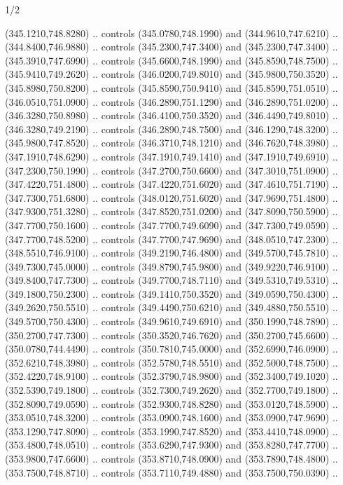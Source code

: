 \begin{flagdescription}{1/2}
\begin{scope}[xshift=0.5\flaglength]
\begin{scope}[scale=0.00745\flagwidth,xshift=-12.1mm,yshift=41.7mm]
\begin{scope}[y=0.80pt, x=0.80pt, yscale=-1, xscale=1, inner sep=0pt, outer sep=0pt]
\begin{scope}[cm={{1.33333,0.0,0.0,-1.33333,(0.0,114.66667)}}]
\begin{scope}[scale=0.100]
  (345.1210,748.8280) .. controls (345.0780,748.1990) and (344.9610,747.6210) ..
  (344.8400,746.9880) .. controls (345.2300,747.3400) and (345.2300,747.3400) ..
  (345.3910,747.6990) .. controls (345.6600,748.1990) and (345.8590,748.7500) ..
  (345.9410,749.2620) .. controls (346.0200,749.8010) and (345.9800,750.3520) ..
  (345.8980,750.8200) .. controls (345.8590,750.9410) and (345.8590,751.0510) ..
  (346.0510,751.0900) .. controls (346.2890,751.1290) and (346.2890,751.0200) ..
  (346.3280,750.8980) .. controls (346.4100,750.3520) and (346.4490,749.8010) ..
  (346.3280,749.2190) .. controls (346.2890,748.7500) and (346.1290,748.3200) ..
  (345.9800,747.8520) .. controls (346.3710,748.1210) and (346.7620,748.3980) ..
  (347.1910,748.6290) .. controls (347.1910,749.1410) and (347.1910,749.6910) ..
  (347.2300,750.1990) .. controls (347.2700,750.6600) and (347.3010,751.0900) ..
  (347.4220,751.4800) .. controls (347.4220,751.6020) and (347.4610,751.7190) ..
  (347.7300,751.6800) .. controls (348.0120,751.6020) and (347.9690,751.4800) ..
  (347.9300,751.3280) .. controls (347.8520,751.0200) and (347.8090,750.5900) ..
  (347.7700,750.1600) .. controls (347.7700,749.6090) and (347.7300,749.0590) ..
  (347.7700,748.5200) .. controls (347.7700,747.9690) and (348.0510,747.2300) ..
  (348.5510,746.9100) .. controls (349.2190,746.4800) and (349.5700,745.7810) ..
  (349.7300,745.0000) .. controls (349.8790,745.9800) and (349.9220,746.9100) ..
  (349.8400,747.7300) .. controls (349.7700,748.7110) and (349.5310,749.5310) ..
  (349.1800,750.2300) .. controls (349.1410,750.3520) and (349.0590,750.4300) ..
  (349.2620,750.5510) .. controls (349.4490,750.6210) and (349.4880,750.5510) ..
  (349.5700,750.4300) .. controls (349.9610,749.6910) and (350.1990,748.7890) ..
  (350.2700,747.7300) .. controls (350.3520,746.7620) and (350.2700,745.6600) ..
  (350.0780,744.4490) .. controls (350.7810,745.0000) and (352.6990,746.0900) ..
  (352.6210,748.3980) .. controls (352.5780,748.5510) and (352.5000,748.7500) ..
  (352.4220,748.9100) .. controls (352.3790,748.9800) and (352.3400,749.1020) ..
  (352.5390,749.1800) .. controls (352.7300,749.2620) and (352.7700,749.1800) ..
  (352.8090,749.0590) .. controls (352.9300,748.8280) and (353.0120,748.5900) ..
  (353.0510,748.3200) .. controls (353.0900,748.1600) and (353.0900,747.9690) ..
  (353.1290,747.8090) .. controls (353.1990,747.8520) and (353.4410,748.0900) ..
  (353.4800,748.0510) .. controls (353.6290,747.9300) and (353.8280,747.7700) ..
  (353.9800,747.6600) .. controls (353.8710,748.0900) and (353.7890,748.4800) ..
  (353.7500,748.8710) .. controls (353.7110,749.4880) and (353.7500,750.0390) ..

\end{scope}
\end{scope}
\end{scope}
\end{scope}
\end{scope}
\end{flagdescription}
